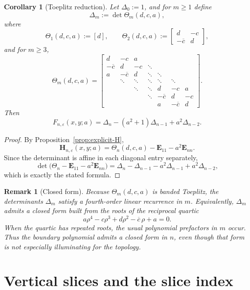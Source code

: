 \documentclass[11pt]{article}
\newtheorem{corollary}[theorem]{Corollary}
\newtheorem{remark}[theorem]{Remark}
\begin{document}
\begin{corollary}[Toeplitz reduction]\label{cor:Toeplitz-reduction}
Let \(\Delta_0:=1\), and for \(m\ge 1\) define
\[
\Delta_m:=\det \Theta_m(d,c,a),
\]
where
\[
\Theta_1(d,c,a):=[d],
\qquad
\Theta_2(d,c,a):=
\begin{bmatrix}
d & -c\\
-\overline c & d
\end{bmatrix},
\]
and for \(m\ge 3\),
\[
\Theta_m(d,c,a)=
\begin{bmatrix}
d & -c & a \\
-\overline c & d & -c & \ddots \\
a & -\overline c & d & \ddots & \ddots \\
& \ddots & \ddots & \ddots & \ddots & \ddots \\
&& \ddots & \ddots & d & -c & a \\
&&& \ddots & -\overline c & d & -c \\
&&&& a & -\overline c & d
\end{bmatrix}.
\]
Then
\[
F_{n,\varepsilon}(x,y;a)
=
\Delta_n-(a^2+1)\Delta_{n-1}+a^2\Delta_{n-2}.
\]
\end{corollary}

\begin{proof}
By Proposition~\ref{prop:explicit-H},
\[
\mathbf H_{n,\varepsilon}(x,y;a)
=
\Theta_n(d,c,a)-\mathbf E_{11}-a^2\mathbf E_{nn}.
\]
Since the determinant is affine in each diagonal entry separately,
\[
\det\bigl(\Theta_n-\mathbf E_{11}-a^2\mathbf E_{nn}\bigr)
=
\Delta_n-\Delta_{n-1}-a^2\Delta_{n-1}+a^2\Delta_{n-2},
\]
which is exactly the stated formula.
\end{proof}

\begin{remark}[Closed form]\label{rem:quartic}
Because \(\Theta_m(d,c,a)\) is banded Toeplitz, the determinants \(\Delta_m\) satisfy a fourth-order linear recurrence in \(m\). Equivalently, \(\Delta_m\) admits a closed form built from the roots of the reciprocal quartic
\[
a\rho^4-c\rho^3+d\rho^2-\overline c\,\rho+a=0.
\]
When the quartic has repeated roots, the usual polynomial prefactors in \(m\) occur. Thus the boundary polynomial admits a closed form in \(n\), even though that form is not especially illuminating for the topology.
\end{remark}

\section{Vertical slices and the slice index}
\end{document}
